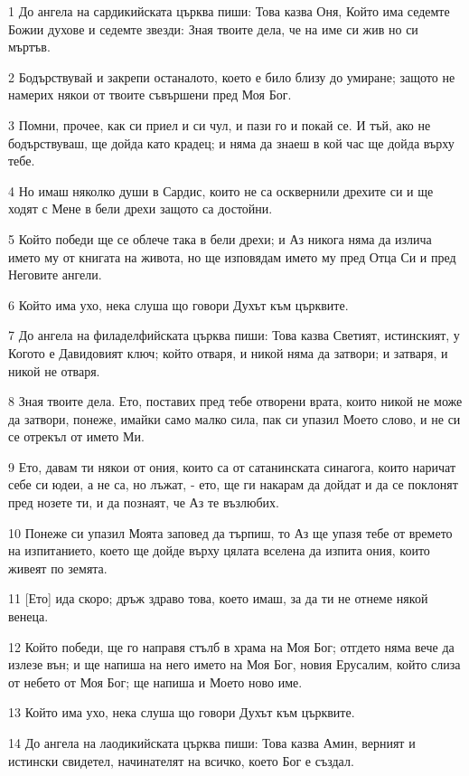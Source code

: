 \par 1 До ангела на сардикийската църква пиши: Това казва Оня, Който има седемте Божии духове и седемте звезди: Зная твоите дела, че на име си жив но си мъртъв.
\par 2 Бодърствувай и закрепи останалото, което е било близу до умиране; защото не намерих някои от твоите съвършени пред Моя Бог.
\par 3 Помни, прочее, как си приел и си чул, и пази го и покай се. И тъй, ако не бодърствуваш, ще дойда като крадец; и няма да знаеш в кой час ще дойда върху тебе.
\par 4 Но имаш няколко души в Сардис, които не са осквернили дрехите си и ще ходят с Мене в бели дрехи защото са достойни.
\par 5 Който победи ще се облече така в бели дрехи; и Аз никога няма да излича името му от книгата на живота, но ще изповядам името му пред Отца Си и пред Неговите ангели.
\par 6 Който има ухо, нека слуша що говори Духът към църквите.
\par 7 До ангела на филаделфийската църква пиши: Това казва Светият, истинският, у Когото е Давидовият ключ; който отваря, и никой няма да затвори; и затваря, и никой не отваря.
\par 8 Зная твоите дела. Ето, поставих пред тебе отворени врата, които никой не може да затвори, понеже, имайки само малко сила, пак си упазил Моето слово, и не си се отрекъл от името Ми.
\par 9 Ето, давам ти някои от ония, които са от сатанинската синагога, които наричат себе си юдеи, а не са, но лъжат, - ето, ще ги накарам да дойдат и да се поклонят пред нозете ти, и да познаят, че Аз те възлюбих.
\par 10 Понеже си упазил Моята заповед да търпиш, то Аз ще упазя тебе от времето на изпитанието, което ще дойде върху цялата вселена да изпита ония, които живеят по земята.
\par 11 [Ето] ида скоро; дръж здраво това, което имаш, за да ти не отнеме някой венеца.
\par 12 Който победи, ще го направя стълб в храма на Моя Бог; отгдето няма вече да излезе вън; и ще напиша на него името на Моя Бог, новия Ерусалим, който слиза от небето от Моя Бог; ще напиша и Моето ново име.
\par 13 Който има ухо, нека слуша що говори Духът към църквите.
\par 14 До ангела на лаодикийската църква пиши: Това казва Амин, верният и истински свидетел, начинателят на всичко, което Бог е създал.
